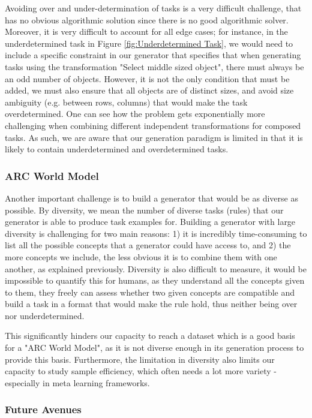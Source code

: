 Avoiding over and under-determination of tasks is a very difficult challenge, that has no obvious algorithmic solution since there is no good algorithmic solver. Moreover, it is very difficult to account for all edge cases; for instance, in the underdetermined task in Figure \ref{fig:Underdetermined Task}, we would need to include a specific constraint in our generator that specifies that when generating tasks using the transformation "Select middle sized object", there must always be an odd number of objects. However, it is not the only condition that must be added, we must also ensure that all objects are of distinct sizes, and avoid size ambiguity (e.g. between rows, columns) that would make the task overdetermined. One can see how the problem gets exponentially more challenging when combining different independent transformations for composed tasks. As such, we are aware that our generation paradigm is limited in that it is likely to contain underdetermined and overdetermined tasks. 

\subsubsection{ARC World Model}

Another important challenge is to build a generator that would be as diverse as possible. By diversity, we mean the number of diverse tasks (rules) that our generator is able to produce task examples for. Building a generator with large diversity is challenging for two main reasons: 1) it is incredibly time-consuming to list all the possible concepts that a generator could have access to, and 2) the more concepts we include, the less obvious it is to combine them with one another, as explained previously. Diversity is also difficult to measure, it would be impossible to quantify this for humans, as they understand all the concepts given to them, they freely can assess whether two given concepts are compatible and build a task in a format that would make the rule hold, thus neither being over nor underdetermined.

This significantly hinders our capacity to reach a dataset which is a good basis for a "ARC World Model", as it is not diverse enough in its generation process to provide this basis. Furthermore, the limitation in diversity also limits our capacity to study sample efficiency, which often needs a lot more variety - especially in meta learning frameworks. 

\subsubsection{Future Avenues}

